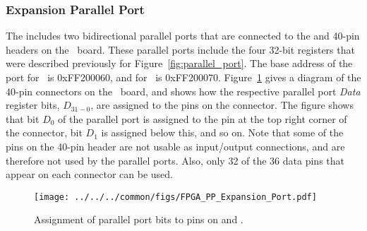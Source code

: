 \subsubsection{Expansion Parallel Port}

The {\it \systemNameFull} includes two bidirectional parallel ports that are connected to the
{\it \expansionPortA} and {\it \expansionPortB} 40-pin headers on the \DEBoard~board. These parallel ports
include the four 32-bit registers that were described previously for 
Figure~\ref{fig:parallel_port}. The base address of the port for \expansionPortA~is {\sf 0xFF200060},
and for \expansionPortB~is {\sf 0xFF200070}.  Figure~\ref{fig:expansion_port} gives a diagram of 
the 40-pin connectors on the \DEBoard~board, and shows how the respective parallel port {\it Data} register bits, 
$D_{31-0}$, are assigned to the pins on the connector. The figure shows that bit $D_0$ of
the parallel port is assigned to the pin at the top right corner of the
connector, bit $D_1$ is assigned below this, and so on. Note that some of the pins on
the 40-pin header are not usable as input/output connections, and are 
therefore not used by the parallel ports. Also, only 32 of the 36 data pins that appear on
each connector can be used.

\begin{figure}[h!]
   \begin{center}
       \texttt{[image: ../../../common/figs/FPGA\_PP\_Expansion\_Port.pdf]}
   \end{center}
	\caption{Assignment of parallel port bits to pins on {\it \expansionPortA} and {\it \expansionPortB}.}
	\label{fig:expansion_port}
\end{figure}

